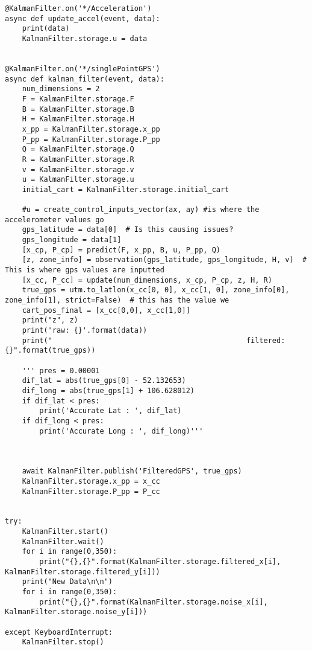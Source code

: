 \documentclass{article}
\begin{document}
\begin{lstlisting}
@KalmanFilter.on('*/Acceleration')
async def update_accel(event, data):
    print(data)
    KalmanFilter.storage.u = data


@KalmanFilter.on('*/singlePointGPS')
async def kalman_filter(event, data):
    num_dimensions = 2
    F = KalmanFilter.storage.F
    B = KalmanFilter.storage.B
    H = KalmanFilter.storage.H
    x_pp = KalmanFilter.storage.x_pp
    P_pp = KalmanFilter.storage.P_pp
    Q = KalmanFilter.storage.Q
    R = KalmanFilter.storage.R
    v = KalmanFilter.storage.v
    u = KalmanFilter.storage.u
    initial_cart = KalmanFilter.storage.initial_cart

    #u = create_control_inputs_vector(ax, ay) #is where the accelerometer values go
    gps_latitude = data[0]  # Is this causing issues?
    gps_longitude = data[1]
    [x_cp, P_cp] = predict(F, x_pp, B, u, P_pp, Q)
    [z, zone_info] = observation(gps_latitude, gps_longitude, H, v)  # This is where gps values are inputted
    [x_cc, P_cc] = update(num_dimensions, x_cp, P_cp, z, H, R)
    true_gps = utm.to_latlon(x_cc[0, 0], x_cc[1, 0], zone_info[0], zone_info[1], strict=False)  # this has the value we
    cart_pos_final = [x_cc[0,0], x_cc[1,0]]
    print("z", z)
    print('raw: {}'.format(data))
    print("                                             filtered: {}".format(true_gps))

    ''' pres = 0.00001
    dif_lat = abs(true_gps[0] - 52.132653)
    dif_long = abs(true_gps[1] + 106.628012)
    if dif_lat < pres:
        print('Accurate Lat : ', dif_lat)
    if dif_long < pres:
        print('Accurate Long : ', dif_long)'''



    await KalmanFilter.publish('FilteredGPS', true_gps)
    KalmanFilter.storage.x_pp = x_cc
    KalmanFilter.storage.P_pp = P_cc


try:
    KalmanFilter.start()
    KalmanFilter.wait()
    for i in range(0,350):
        print("{},{}".format(KalmanFilter.storage.filtered_x[i], KalmanFilter.storage.filtered_y[i]))
    print("New Data\n\n")
    for i in range(0,350):
        print("{},{}".format(KalmanFilter.storage.noise_x[i], KalmanFilter.storage.noise_y[i]))

except KeyboardInterrupt:
    KalmanFilter.stop()

\end{lstlisting}



\begin{comment}



\end{comment}
\end{document}
